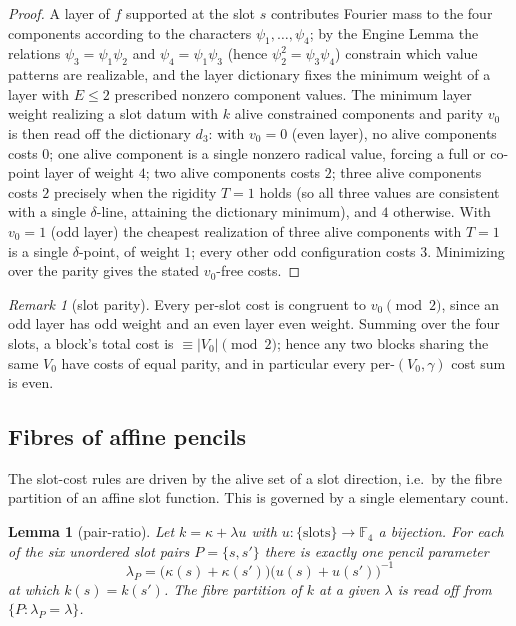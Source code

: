 \documentclass[11pt]{article}
\newcommand{\F}[1]{\mathbb{F}_{#1}}
\newcommand{\wt}[1]{\lvert #1\rvert}
\theoremstyle{plain}
\newtheorem{lemma}{Lemma}[section]
\theoremstyle{definition}
\theoremstyle{remark}
\newtheorem*{remark}{Remark}
\begin{document}
\begin{proof}
A layer of $f$ supported at the slot $s$ contributes Fourier mass to the four
components according to the characters $\psi_1,\dots,\psi_4$; by the Engine
Lemma the relations $\psi_3=\psi_1\psi_2$ and $\psi_4=\psi_1\psi_3$ (hence
$\psi_2^2=\psi_3\psi_4$) constrain which value patterns are realizable, and the
layer dictionary fixes the minimum weight of a layer with $E\le 2$ prescribed
nonzero component values. The minimum layer weight realizing a slot datum with
$k$ alive constrained components and parity $v_0$ is then read off the dictionary
$d_3$: with $v_0=0$ (even layer), no alive components costs $0$; one alive
component is a single nonzero radical value, forcing a full or co-point layer of
weight $4$; two alive components costs $2$; three alive components costs $2$
precisely when the rigidity $T=1$ holds (so all three values are consistent with
a single $\delta$-line, attaining the dictionary minimum), and $4$ otherwise.
With $v_0=1$ (odd layer) the cheapest realization of three alive components with
$T=1$ is a single $\delta$-point, of weight $1$; every other odd configuration
costs $3$. Minimizing over the parity gives the stated $v_0$-free costs.
\end{proof}

\begin{remark}[slot parity]
Every per-slot cost is congruent to $v_0\pmod 2$, since an odd layer has odd
weight and an even layer even weight. Summing over the four slots, a block's
total cost is $\equiv\wt{V_0}\pmod 2$; hence any two blocks sharing the same
$V_0$ have costs of equal parity, and in particular every per-$(V_0,\gamma)$
cost sum is even.
\end{remark}

\subsection{Fibres of affine pencils}\label{ssec:pencil}

The slot-cost rules are driven by the alive set of a slot direction, i.e.\ by the
fibre partition of an affine slot function. This is governed by a single
elementary count.

\begin{lemma}[pair-ratio]\label{lem:pencil}
Let $k=\kappa+\lambda u$ with $u\colon\{\text{slots}\}\to\F4$ a bijection. For each
of the six unordered slot pairs $P=\{s,s'\}$ there is exactly one pencil parameter
\[
  \lambda_P=\bigl(\kappa(s)+\kappa(s')\bigr)\bigl(u(s)+u(s')\bigr)^{-1}
\]
at which $k(s)=k(s')$. The fibre partition of $k$ at a given $\lambda$ is read off
from $\{P:\lambda_P=\lambda\}$.
\end{lemma}
\end{document}
